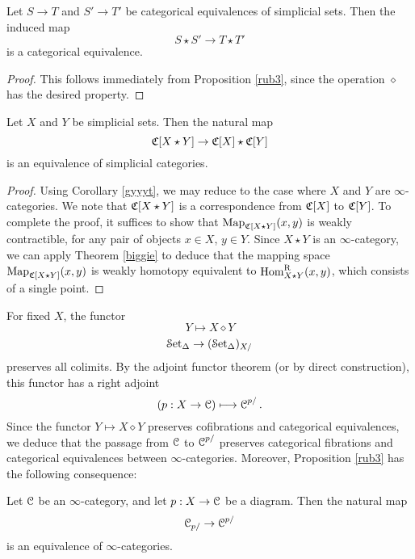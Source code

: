 \begin{corollary}\label{gyyyt}
Let $S \rightarrow T$ and $S' \rightarrow T'$ be categorical
equivalences of simplicial sets. Then the induced map
$$ S \star S' \rightarrow T \star T'$$ is a categorical
equivalence.
\end{corollary}

\begin{proof}
This follows immediately from Proposition \ref{rub3}, since the operation $\diamond$
has the desired property.
\end{proof}

\begin{corollary}\label{diamond3}
Let $X$ and $Y$ be simplicial sets. Then the natural map
$$ \operatorname{\mathfrak{C}}[X \star Y] \rightarrow \operatorname{\mathfrak{C}}[X] \star
\operatorname{\mathfrak{C}}[Y]$$ is an equivalence of simplicial categories.
\end{corollary}

\begin{proof}
Using Corollary \ref{gyyyt}, we may reduce to the case where $X$ and $Y$ are $\infty$-categories.
We note that $\operatorname{\mathfrak{C}}[X \star Y]$ is a correspondence from $\operatorname{\mathfrak{C}}[X]$ to
$\operatorname{\mathfrak{C}}[Y]$. To complete the proof, it suffices to show that 
$\operatorname{{Map}}_{\operatorname{\mathfrak{C}}[X \star Y]}(x,y)$ is weakly contractible, for any
pair of objects $x \in X$, $y \in Y$. Since $X \star Y$ is an $\infty$-category, we can apply Theorem \ref{biggie} to deduce that the mapping space $\operatorname{{Map}}_{\operatorname{\mathfrak{C}}[X \star Y]}(x,y)$ is weakly homotopy equivalent to $\operatorname{Hom}^{\operatorname{R}}_{X \star Y}(x,y)$, which consists of a single point.
\end{proof}

For fixed $X$, the functor
$$ Y \mapsto X \diamond Y$$
$$ \operatorname{\mathcal{S}et_{\Delta}} \rightarrow (\operatorname{\mathcal{S}et_{\Delta}})_{X/}$$
preserves all colimits. By the adjoint functor theorem (or by direct construction), this functor has a right adjoint $$ ( p: X \rightarrow \operatorname{\mathcal{C}}) \longmapsto \operatorname{\mathcal{C}}^{p/}. $$
Since the functor $Y \mapsto X \diamond Y$ preserves cofibrations and categorical equivalences, we deduce that
the passage from $\operatorname{\mathcal{C}}$ to $\operatorname{\mathcal{C}}^{p/}$ preserves categorical fibrations and categorical equivalences between $\infty$-categories. Moreover, Proposition \ref{rub3} has the following consequence:

\begin{proposition}\label{certs}
Let $\operatorname{\mathcal{C}}$ be an $\infty$-category, and let $p: X \rightarrow \operatorname{\mathcal{C}}$ be a diagram. Then the natural map $$ \operatorname{\mathcal{C}}_{p/} \rightarrow \operatorname{\mathcal{C}}^{p/}$$ is an equivalence of $\infty$-categories.
\end{proposition}

